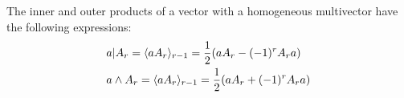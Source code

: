 \begin{lemma}\label{l:v-mv-product}
	The inner and outer products of a vector with a homogeneous multivector have the following expressions:
	\begin{align*}
		& a | A_r = \langle aA_r \rangle_{r-1} = \frac{1}{2}(aA_r-(-1)^rA_ra) \\
		& a \wedge A_r = \langle aA_r \rangle_{r-1} = \frac{1}{2}(aA_r+(-1)^rA_ra)
	\end{align*}
\end{lemma}
